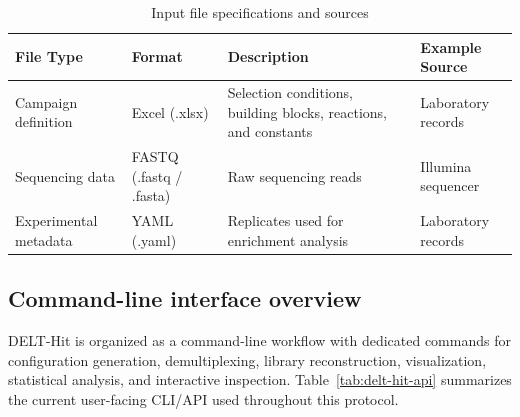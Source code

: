 \documentclass[pdflatex,sn-nature]{sn-jnl}
\begin{document}
\begin{table}[htbp]
\centering
\caption{Input file specifications and sources}
\label{tab:table1}
\begin{tabular}{p{3.2cm}p{3.0cm}p{5.8cm}p{2.5cm}}
\toprule
File Type & Format & Description & Example Source \\
\midrule
Campaign definition & Excel (.xlsx) & Selection conditions, building blocks, reactions, and constants & Laboratory records \\
Sequencing data & FASTQ (.fastq / .fasta) & Raw sequencing reads & Illumina sequencer \\
Experimental metadata & YAML (.yaml) & Replicates used for enrichment analysis & Laboratory records \\
\bottomrule
\end{tabular}
\end{table}

\subsection{Command-line interface overview}
DELT-Hit is organized as a command-line workflow with dedicated commands for configuration generation, demultiplexing, library reconstruction, visualization, statistical analysis, and interactive inspection. Table~\ref{tab:delt-hit-api} summarizes the current user-facing CLI/API used throughout this protocol.
\end{document}
